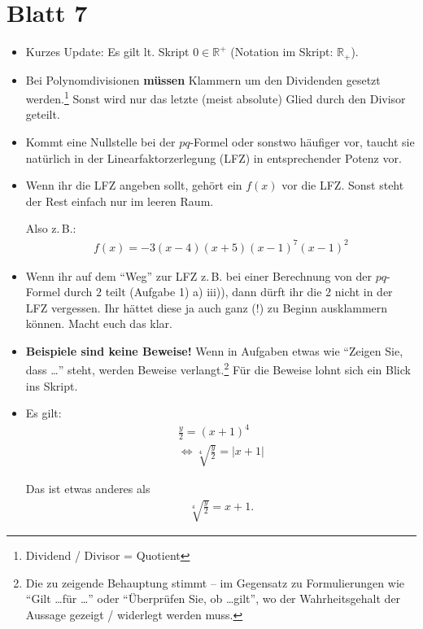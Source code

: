 \documentclass[11pt, a4paper]{article}
\newcommand{\R}{\mathbb{R}}
\begin{document}
\section*{Blatt 7}
\begin{itemize}
\item Kurzes Update: Es gilt lt. Skript $0 \in \R^{+}$ (Notation im Skript: $\R_{+}$).

\item Bei Polynomdivisionen \textbf{müssen} Klammern um den Dividenden gesetzt werden.\footnote{Dividend / Divisor = Quotient} Sonst wird nur das letzte (meist absolute) Glied durch den Divisor geteilt.

\item Kommt eine Nullstelle bei der $pq$-Formel oder sonstwo häufiger vor, taucht sie natürlich in der Linearfaktorzerlegung (LFZ) in entsprechender Potenz vor.

\item Wenn ihr die LFZ angeben sollt, gehört ein $f(x)$ vor die LFZ. Sonst steht der Rest einfach nur im leeren Raum. 

Also z.\,B.:
\begin{align*}
f(x) = -3(x-4)(x+5)(x-1)^7(x-1)^2
\end{align*}

\item Wenn ihr auf dem \enquote{Weg} zur LFZ z.\,B. bei einer Berechnung von der $pq$-Formel durch $2$ teilt (Aufgabe 1) a) iii)), dann dürft ihr die 2 nicht in der LFZ vergessen. Ihr hättet diese ja auch ganz (!) zu Beginn ausklammern können. Macht euch das klar.

\item \textbf{Beispiele sind keine Beweise!} Wenn in Aufgaben etwas wie \enquote{Zeigen Sie, dass \dots} steht, werden Beweise verlangt.\footnote{Die zu zeigende Behauptung stimmt -- im Gegensatz zu Formulierungen wie \enquote{Gilt \dots für \dots} oder \enquote{Überprüfen Sie, ob \dots gilt}, wo der Wahrheitsgehalt der Aussage gezeigt / widerlegt werden muss.} Für die Beweise lohnt sich ein Blick ins Skript.

\item Es gilt:
\begin{align*}
\frac{y}{2} = (x+1)^4\\
\Leftrightarrow \sqrt[4]{\frac{y}{2}} = |x + 1|
\end{align*}

Das ist etwas anderes als
\begin{align*}
\sqrt[4]{\frac{y}{2}} = x + 1.
\end{align*}


\end{itemize}
\end{document}
